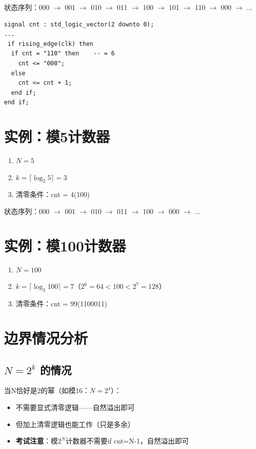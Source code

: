 状态序列：000 $\to$ 001 $\to$ 010 $\to$ 011 $\to$ 100 $\to$ 101 $\to$ 110 $\to$ 000 $\to$ ...

\begin{lstlisting}[caption={模7计数器}]
signal cnt : std_logic_vector(2 downto 0);
...
 if rising_edge(clk) then
  if cnt = "110" then    -- = 6
    cnt <= "000";
  else
    cnt <= cnt + 1;
  end if;
end if;
\end{lstlisting}

\section{实例：模5计数器}

\begin{enumerate}
  \item $N = 5$
  \item $k = \lceil \log_2 5 \rceil = 3$
  \item 清零条件：cnt = 4(100)
\end{enumerate}

状态序列：000 $\to$ 001 $\to$ 010 $\to$ 011 $\to$ 100 $\to$ 000 $\to$ ...

\section{实例：模100计数器}

\begin{enumerate}
  \item $N = 100$
  \item $k = \lceil \log_2 100 \rceil = 7$（$2^6=64<100<2^7=128$）
  \item 清零条件：cnt = 99(1100011)
\end{enumerate}

\section{边界情况分析}

\subsection{$N = 2^k$ 的情况}

当N恰好是2的幂（如模16：$N = 2^4$）：
\begin{itemize}
  \item 不需要显式清零逻辑——自然溢出即可
  \item 但加上清零逻辑也能工作（只是多余）
  \item \textbf{考试注意}：模$2^N$计数器不需要if cnt=N-1，自然溢出即可
\end{itemize}


